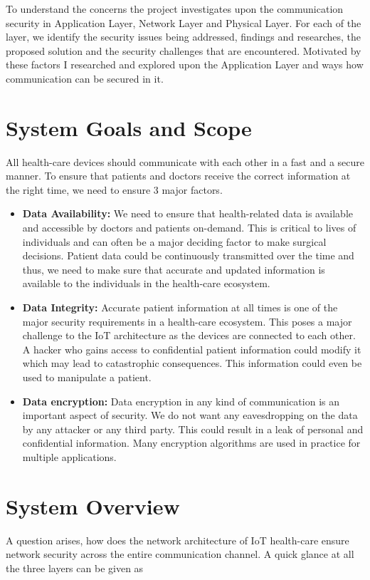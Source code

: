 \documentclass[letterpaper, 10 pt, conference]{ieeeconf}  %
\begin{document}
\indent To understand the concerns the project investigates upon the communication security in Application Layer, Network Layer and Physical Layer. For each of the layer, we identify the security issues being addressed, findings and researches, the proposed solution and the security challenges that are encountered. Motivated by these factors I researched and explored upon the Application Layer and ways how communication can be secured in it.

\section{System Goals and Scope}
All health-care devices should communicate with each other in a fast and a secure manner. To ensure that patients and doctors receive the correct information at the right time, we need to ensure 3 major factors.
\\
\begin{itemize}
\item \textbf{Data Availability:} We need to ensure that health-related data is available and accessible by doctors and patients on-demand. This is critical to lives of individuals and can often be a major deciding factor to make surgical decisions. Patient data could be continuously transmitted over the time and thus, we need to make sure that accurate and updated information is available to the individuals in the health-care ecosystem.
\\
\item \textbf{Data Integrity:} Accurate patient information at all times is one of the major security requirements in a health-care ecosystem. This poses a major challenge to the IoT architecture as the devices are connected to each other. A hacker who gains access to confidential patient information could modify it which may lead to catastrophic consequences. This information could even be used to manipulate a patient.
\\
\item \textbf{Data encryption:} Data encryption in any kind of communication is an important aspect of security. We do not want any eavesdropping on the data by any attacker or any third party. This could result in a leak of personal and confidential information. Many encryption algorithms are used in practice for multiple applications.
\end{itemize}

\section{System Overview}
A question arises, how does the network architecture of IoT health-care ensure network security across the entire communication channel. A quick glance at all the three layers can be given as
\end{document}
